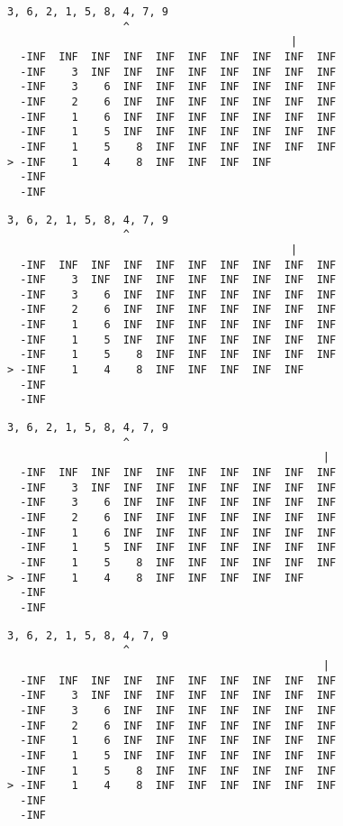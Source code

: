 { \begin{verbatim}
3, 6, 2, 1, 5, 8, 4, 7, 9
                  ^
                                            |
  -INF  INF  INF  INF  INF  INF  INF  INF  INF  INF
  -INF    3  INF  INF  INF  INF  INF  INF  INF  INF
  -INF    3    6  INF  INF  INF  INF  INF  INF  INF
  -INF    2    6  INF  INF  INF  INF  INF  INF  INF
  -INF    1    6  INF  INF  INF  INF  INF  INF  INF
  -INF    1    5  INF  INF  INF  INF  INF  INF  INF
  -INF    1    5    8  INF  INF  INF  INF  INF  INF
> -INF    1    4    8  INF  INF  INF  INF          
  -INF                                             
  -INF                                             
\end{verbatim} }

{ \begin{verbatim}
3, 6, 2, 1, 5, 8, 4, 7, 9
                  ^
                                            |
  -INF  INF  INF  INF  INF  INF  INF  INF  INF  INF
  -INF    3  INF  INF  INF  INF  INF  INF  INF  INF
  -INF    3    6  INF  INF  INF  INF  INF  INF  INF
  -INF    2    6  INF  INF  INF  INF  INF  INF  INF
  -INF    1    6  INF  INF  INF  INF  INF  INF  INF
  -INF    1    5  INF  INF  INF  INF  INF  INF  INF
  -INF    1    5    8  INF  INF  INF  INF  INF  INF
> -INF    1    4    8  INF  INF  INF  INF  INF     
  -INF                                             
  -INF                                             
\end{verbatim} }

{ \begin{verbatim}
3, 6, 2, 1, 5, 8, 4, 7, 9
                  ^
                                                 |
  -INF  INF  INF  INF  INF  INF  INF  INF  INF  INF
  -INF    3  INF  INF  INF  INF  INF  INF  INF  INF
  -INF    3    6  INF  INF  INF  INF  INF  INF  INF
  -INF    2    6  INF  INF  INF  INF  INF  INF  INF
  -INF    1    6  INF  INF  INF  INF  INF  INF  INF
  -INF    1    5  INF  INF  INF  INF  INF  INF  INF
  -INF    1    5    8  INF  INF  INF  INF  INF  INF
> -INF    1    4    8  INF  INF  INF  INF  INF     
  -INF                                             
  -INF                                             
\end{verbatim} }

{ \begin{verbatim}
3, 6, 2, 1, 5, 8, 4, 7, 9
                  ^
                                                 |
  -INF  INF  INF  INF  INF  INF  INF  INF  INF  INF
  -INF    3  INF  INF  INF  INF  INF  INF  INF  INF
  -INF    3    6  INF  INF  INF  INF  INF  INF  INF
  -INF    2    6  INF  INF  INF  INF  INF  INF  INF
  -INF    1    6  INF  INF  INF  INF  INF  INF  INF
  -INF    1    5  INF  INF  INF  INF  INF  INF  INF
  -INF    1    5    8  INF  INF  INF  INF  INF  INF
> -INF    1    4    8  INF  INF  INF  INF  INF  INF
  -INF                                             
  -INF                                             
\end{verbatim} }

